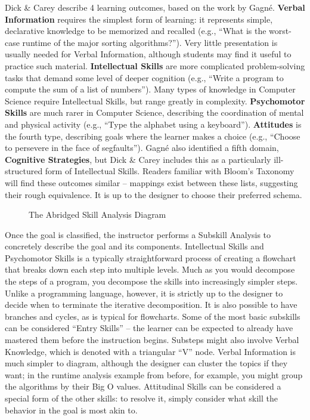 \documentclass{sig-alternate}
\begin{document}
Dick \& Carey describe 4 learning outcomes, based on the work by Gagn\'{e}.
\textbf{Verbal Information} requires the simplest form of learning: it represents simple, declarative knowledge to be memorized and recalled (e.g., ``What is the worst-case runtime of the major sorting algorithms?'').
Very little presentation is usually needed for Verbal Information, although students may find it useful to practice such material.
\textbf{Intellectual Skills} are more complicated problem-solving tasks that demand some level of deeper cognition (e.g., ``Write a program to compute the sum of a list of numbers'').
Many types of knowledge in Computer Science require Intellectual Skills, but range greatly in complexity.
\textbf{Psychomotor Skills} are much rarer in Computer Science, describing the coordination of mental and physical activity (e.g., ``Type the alphabet using a keyboard'').
\textbf{Attitudes} is the fourth type, describing goals where the learner makes a choice (e.g., ``Choose to persevere in the face of segfaults'').
Gagn\'{e} also identified a fifth domain, \textbf{Cognitive Strategies}, but Dick \& Carey includes this as a particularly ill-structured form of Intellectual Skills.
Readers familiar with Bloom's Taxonomy will find these outcomes similar -- mappings exist between these lists, suggesting their rough equivalence.
It is up to the designer to choose their preferred schema.

\begin{figure*}
\begin{center}
\end{center}
\vspace{-\bigskipamount}
\caption{The Abridged Skill Analysis Diagram}
\label{fig-sa}
\end{figure*}

Once the goal is classified, the instructor performs a Subskill Analysis to concretely describe the goal and its components. 
Intellectual Skills and Psychomotor Skills is a typically straightforward process of creating a flowchart that breaks down each step into multiple levels.
Much as you would decompose the steps of a program, you decompose the skills into increasingly simpler steps.
Unlike a programming language, however, it is strictly up to the designer to decide when to terminate the iterative decomposition.
It is also possible to have branches and cycles, as is typical for flowcharts.
Some of the most basic subskills can be considered ``Entry Skills'' -- the learner can be expected to already have mastered them before the instruction begins.
Substeps might also involve Verbal Knowledge, which is denoted with a triangular ``V'' node.
Verbal Information is much simpler to diagram, although the designer can cluster the topics if they want;
in the runtime analysis example from before, for example, you might group the algorithms by their Big O values.
Attitudinal Skills can be considered a special form of the other skills: to resolve it, simply consider what skill the behavior in the goal is most akin to.
\end{document}
